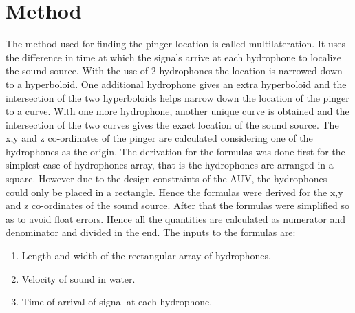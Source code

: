 \section{Method}\label{sec:method}
The method used for finding the pinger location is called multilateration. It uses the difference in time at which the signals arrive at each hydrophone to localize the sound source. With the use of 2 hydrophones the location is narrowed down to a hyperboloid. One additional hydrophone gives an extra hyperboloid and the intersection of the two hyperboloids helps narrow down the location of the pinger to a curve. With one more hydrophone, another unique curve is obtained and the intersection of the two curves gives the exact location of the sound source. The x,y and z co-ordinates of the pinger are calculated considering one of the hydrophones as the origin.\newline
The derivation for the formulas was done first for the simplest case of hydrophones array, that is the hydrophones are arranged in a square. However due to the design constraints of the AUV, the hydrophones could only be placed in a rectangle. Hence the formulas were derived for the x,y and z co-ordinates of the sound source. After that the formulas were simplified so as to avoid float errors. Hence all the quantities are calculated as numerator and denominator and divided in the end.\newline
The inputs to the formulas are:\begin{enumerate}
\item Length and width of the rectangular array of hydrophones.
\item Velocity of sound in water.
\item Time of arrival of signal at each hydrophone.
\end{enumerate}


